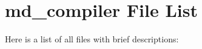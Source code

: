 \section{md\_\-compiler File List}
Here is a list of all files with brief descriptions:\begin{CompactList}
\item{}
\item{}
\end{CompactList}
